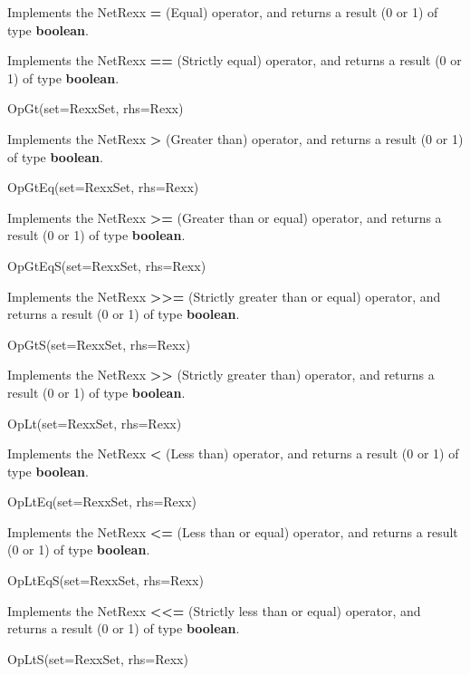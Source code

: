 \begin{description}
Implements the NetRexx \textbf{\textbf{=}} (Equal) operator,
and returns a result (0 or 1) of type \textbf{boolean}.
\item[OpEqS(set=RexxSet, rhs=Rexx)]\label{refopeqs}

Implements the NetRexx \textbf{\textbf{==}} (Strictly equal)
operator, and returns a result (0 or 1) of type \textbf{boolean}.
\item{OpGt(set=RexxSet, rhs=Rexx)}

Implements the NetRexx \textbf{\textbf{>}} (Greater than)
operator, and returns a result (0 or 1) of type \textbf{boolean}.
\item{OpGtEq(set=RexxSet, rhs=Rexx)}

Implements the NetRexx \textbf{\textbf{>=}} (Greater than or equal)
operator, and returns a result (0 or 1) of type \textbf{boolean}.
\item{OpGtEqS(set=RexxSet, rhs=Rexx)}

Implements the NetRexx \textbf{\textbf{>>=}} (Strictly greater than
or equal) operator, and returns a result (0 or 1) of
type \textbf{boolean}.
\item{OpGtS(set=RexxSet, rhs=Rexx)}

Implements the NetRexx \textbf{\textbf{>>}} (Strictly greater than)
operator, and returns a result (0 or 1) of type \textbf{boolean}.
\item{OpLt(set=RexxSet, rhs=Rexx)}

Implements the NetRexx \textbf{\textbf{<}} (Less than)
operator, and returns a result (0 or 1) of type \textbf{boolean}.
\item{OpLtEq(set=RexxSet, rhs=Rexx)}

Implements the NetRexx \textbf{\textbf{<=}} (Less than or equal)
operator, and returns a result (0 or 1) of type \textbf{boolean}.
\item{OpLtEqS(set=RexxSet, rhs=Rexx)}

Implements the NetRexx \textbf{\textbf{<<=}} (Strictly less than
or equal) operator, and returns a result (0 or 1) of
type \textbf{boolean}.
\item{OpLtS(set=RexxSet, rhs=Rexx)}


\end{description}
